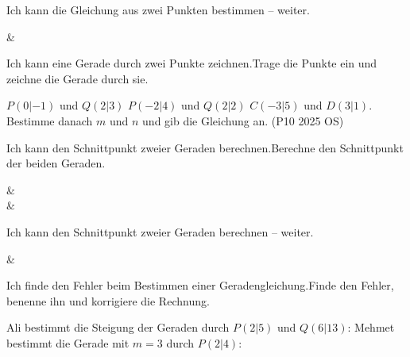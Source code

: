\begin{aufgabe}{Ich kann die Gleichung aus zwei Punkten bestimmen – weiter.}
\begin{gleichungsraster}[3]
 &  \\
\end{gleichungsraster}
\end{aufgabe}

\begin{aufgabe}{Ich kann eine Gerade durch zwei Punkte zeichnen.\newline Trage die Punkte ein und zeichne die Gerade durch sie.}
\begin{teile}
\teil $P(0|{-1})$ und $Q(2|3)$
\teil $P({-2}|4)$ und $Q(2|2)$
\teil $C({-3}|5)$ und $D(3|1)$. Bestimme danach $m$ und $n$ und gib die Gleichung an. (P10 2025 OS) \quad {}
\end{teile}

\begin{ksys}[xmin=-4,xmax=4,ymin=-3,ymax=6]
\end{ksys}

\end{aufgabe}


\begin{aufgabe}{Ich kann den Schnittpunkt zweier Geraden berechnen.\newline Berechne den Schnittpunkt der beiden Geraden.}
\begin{gleichungsraster}[3]
 &  \\
 & \\
\end{gleichungsraster}
\end{aufgabe}

\begin{aufgabe}{Ich kann den Schnittpunkt zweier Geraden berechnen – weiter.}
\begin{gleichungsraster}[3]
 &  \\
\end{gleichungsraster}
\end{aufgabe}


\begin{aufgabe}{Ich finde den Fehler beim Bestimmen einer Geradengleichung.\newline Finde den Fehler, benenne ihn und korrigiere die Rechnung.}
\begin{teile}
\teil Ali bestimmt die Steigung der Geraden durch $P(2|5)$ und $Q(6|13)$:
\teil Mehmet bestimmt die Gerade mit $m = 3$ durch $P(2|4)$:
\end{teile}
\end{aufgabe}

